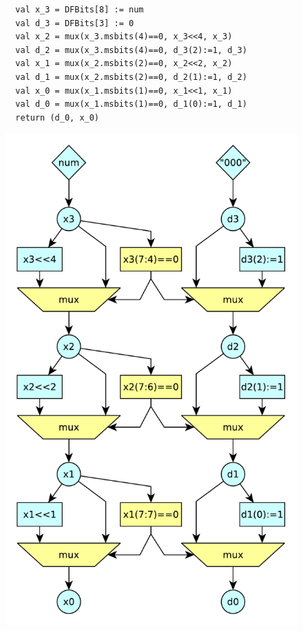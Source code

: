 \begin{figure}[h]
  \begin{verbatim}
  val x_3 = DFBits[8] := num
  val d_3 = DFBits[3] := 0
  val x_2 = mux(x_3.msbits(4)==0, x_3<<4, x_3)
  val d_2 = mux(x_3.msbits(4)==0, d_3(2):=1, d_3)
  val x_1 = mux(x_2.msbits(2)==0, x_2<<2, x_2)
  val d_1 = mux(x_2.msbits(2)==0, d_2(1):=1, d_2)
  val x_0 = mux(x_1.msbits(1)==0, x_1<<1, x_1)
  val d_0 = mux(x_1.msbits(1)==0, d_1(0):=1, d_1)
  return (d_0, x_0)
  \end{verbatim}
  \label{fig:LZC_unrolled_code}
\end{figure}


\begin{figure}[h]
  \centering
  \includegraphics[width=0.8\linewidth]{graphics/lzc_dataflow.pdf}
  \label{fig:LZC_Dataflow}
\end{figure}

